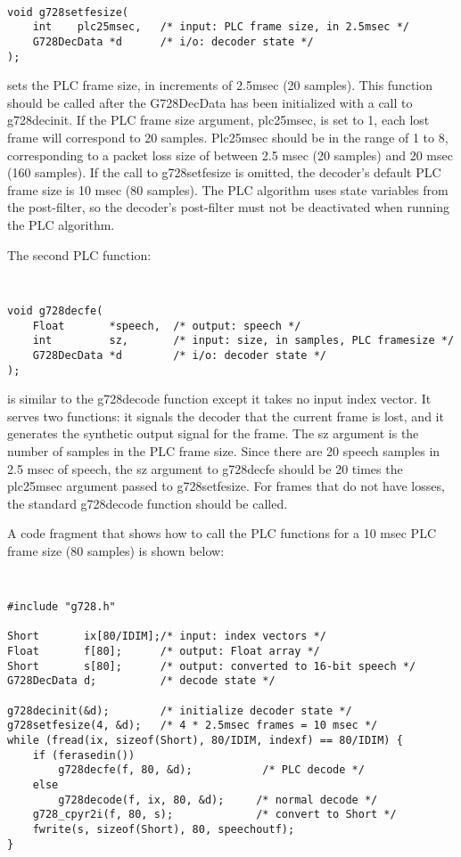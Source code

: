 {\tt\small
\begin{verbatim}
void g728setfesize(
    int    plc25msec,   /* input: PLC frame size, in 2.5msec */
    G728DecData *d      /* i/o: decoder state */
);	
\end{verbatim}
}

sets the PLC frame size, in increments of 2.5msec (20 samples).
This function should be called after the G728DecData has been initialized
with a call to g728decinit. If the PLC frame size argument, plc25msec, is
set to 1, each lost frame will correspond to 20 samples. Plc25msec should
be in the range of 1 to 8, corresponding to a packet loss size of between
2.5 msec (20 samples) and 20 msec (160 samples). If the call to g728setfesize
is omitted, the decoder's default PLC frame size is 10 msec (80 samples).
The PLC algorithm uses state variables from the post-filter, so
the decoder's post-filter must not be deactivated when running the PLC algorithm.

The second PLC function:

{\tt\small
\begin{verbatim}
void g728decfe(
    Float       *speech,  /* output: speech */
    int         sz,       /* input: size, in samples, PLC framesize */
    G728DecData *d        /* i/o: decoder state */	
);
\end{verbatim}
}

is similar to the g728decode function except it takes no input index vector.
It serves two functions: it signals the decoder that the current frame
is lost, and it generates the synthetic output signal for the frame.
The sz argument is the number of samples in the PLC frame size.
Since there are 20 speech samples in 2.5 msec of speech, the sz argument to
g728decfe should be 20 times the plc25msec argument passed to g728setfesize.
For frames that do not have losses, the standard g728decode function should
be called.

A code fragment that shows how to call the PLC functions for a 10 msec PLC
frame size (80 samples) is shown below:

{\tt\small
\begin{verbatim}
#include "g728.h"

Short       ix[80/IDIM];/* input: index vectors */
Float       f[80];      /* output: Float array */
Short       s[80];      /* output: converted to 16-bit speech */
G728DecData d;          /* decode state */

g728decinit(&d);        /* initialize decoder state */
g728setfesize(4, &d);   /* 4 * 2.5msec frames = 10 msec */
while (fread(ix, sizeof(Short), 80/IDIM, indexf) == 80/IDIM) {
    if (ferasedin())
        g728decfe(f, 80, &d);           /* PLC decode */
    else
        g728decode(f, ix, 80, &d);     /* normal decode */
    g728_cpyr2i(f, 80, s);             /* convert to Short */
    fwrite(s, sizeof(Short), 80, speechoutf);
}
\end{verbatim}
}

